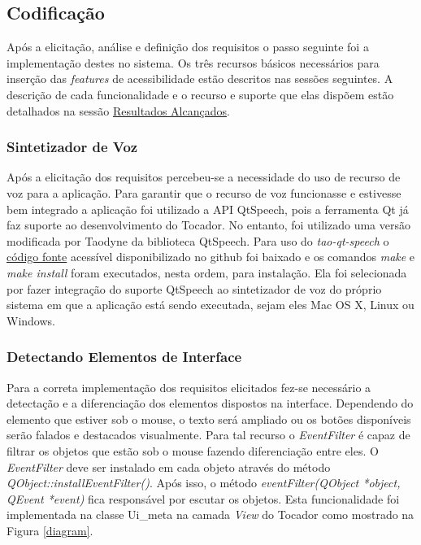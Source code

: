 \subsection{Codificação}

Após a elicitação, análise e definição dos requisitos o passo seguinte foi a implementação destes no sistema. Os três recursos básicos necessários para inserção das \textit{features} de acessibilidade estão descritos nas sessões seguintes. A descrição de cada funcionalidade e o recurso e suporte que elas dispõem estão detalhados na sessão \hyperref[cap4]{Resultados Alcançados}.

\subsubsection{Sintetizador de Voz}

Após a elicitação dos requisitos percebeu-se a necessidade do uso de recurso de voz para a aplicação. Para garantir que o recurso de voz funcionasse e estivesse bem integrado a aplicação foi utilizado a API QtSpeech, pois a ferramenta Qt já faz suporte ao desenvolvimento do Tocador. No entanto, foi utilizado uma versão modificada por Taodyne da biblioteca QtSpeech. Para uso do \textit{tao-qt-speech} o \href{https://github.com/c3d/tao-qt-speech.git}{código fonte} acessível disponibilizado no github foi baixado e os comandos \textit{make} e \textit{make install} foram executados, nesta ordem, para instalação. Ela foi selecionada por fazer integração do suporte QtSpeech ao sintetizador de voz do próprio sistema em que a aplicação está sendo executada, sejam eles Mac OS X, Linux ou Windows.


\subsubsection{Detectando Elementos de Interface}\label{detect}

Para a correta implementação dos requisitos elicitados fez-se necessário a detectação e a diferenciação dos elementos dispostos na interface. Dependendo do elemento que estiver sob o mouse, o texto será ampliado ou os botões disponíveis serão falados e destacados visualmente. Para tal recurso o \textit{EventFilter} é capaz de filtrar os objetos que estão sob o mouse fazendo diferenciação entre eles. O \textit{EventFilter} deve ser instalado em cada objeto através do método \textit{QObject::installEventFilter()}. Após isso, o método \textit{eventFilter(QObject *object, QEvent *event)} fica responsável por escutar os objetos. Esta funcionalidade foi implementada na classe Ui\_meta na camada \textit{View} do Tocador como mostrado na Figura \ref{diagram}.

